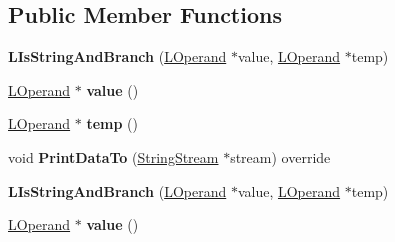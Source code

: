 \subsection*{Public Member Functions}
\begin{DoxyCompactItemize}
\item 
{\bfseries L\+Is\+String\+And\+Branch} (\hyperlink{classv8_1_1internal_1_1_l_operand}{L\+Operand} $\ast$value, \hyperlink{classv8_1_1internal_1_1_l_operand}{L\+Operand} $\ast$temp)\hypertarget{classv8_1_1internal_1_1_l_is_string_and_branch_a6067b8391a6f1ac2c59632abfa522562}{}\label{classv8_1_1internal_1_1_l_is_string_and_branch_a6067b8391a6f1ac2c59632abfa522562}

\item 
\hyperlink{classv8_1_1internal_1_1_l_operand}{L\+Operand} $\ast$ {\bfseries value} ()\hypertarget{classv8_1_1internal_1_1_l_is_string_and_branch_abece2b9c14409984c96ed6e3bbe7f4af}{}\label{classv8_1_1internal_1_1_l_is_string_and_branch_abece2b9c14409984c96ed6e3bbe7f4af}

\item 
\hyperlink{classv8_1_1internal_1_1_l_operand}{L\+Operand} $\ast$ {\bfseries temp} ()\hypertarget{classv8_1_1internal_1_1_l_is_string_and_branch_aad801de23c18615fb4b86d96ed737213}{}\label{classv8_1_1internal_1_1_l_is_string_and_branch_aad801de23c18615fb4b86d96ed737213}

\item 
void {\bfseries Print\+Data\+To} (\hyperlink{classv8_1_1internal_1_1_string_stream}{String\+Stream} $\ast$stream) override\hypertarget{classv8_1_1internal_1_1_l_is_string_and_branch_a73e3b6617ffccaeffedca5703966d402}{}\label{classv8_1_1internal_1_1_l_is_string_and_branch_a73e3b6617ffccaeffedca5703966d402}

\item 
{\bfseries L\+Is\+String\+And\+Branch} (\hyperlink{classv8_1_1internal_1_1_l_operand}{L\+Operand} $\ast$value, \hyperlink{classv8_1_1internal_1_1_l_operand}{L\+Operand} $\ast$temp)\hypertarget{classv8_1_1internal_1_1_l_is_string_and_branch_a6067b8391a6f1ac2c59632abfa522562}{}\label{classv8_1_1internal_1_1_l_is_string_and_branch_a6067b8391a6f1ac2c59632abfa522562}

\item 
\hyperlink{classv8_1_1internal_1_1_l_operand}{L\+Operand} $\ast$ {\bfseries value} ()\hypertarget{classv8_1_1internal_1_1_l_is_string_and_branch_abece2b9c14409984c96ed6e3bbe7f4af}{}\label{classv8_1_1internal_1_1_l_is_string_and_branch_abece2b9c14409984c96ed6e3bbe7f4af}


\end{DoxyCompactItemize}
